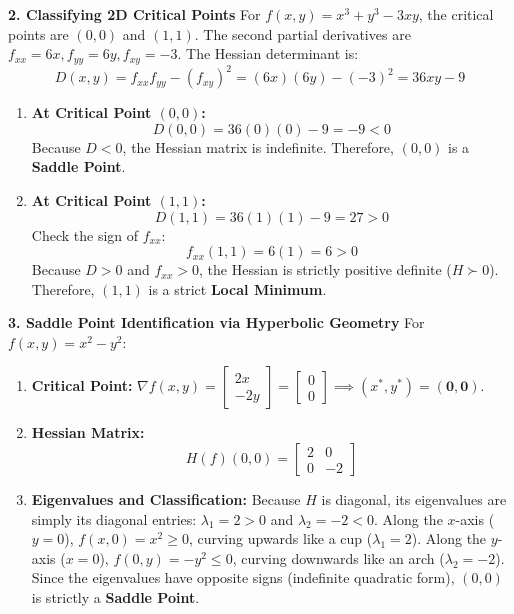 \textbf{2. Classifying 2D Critical Points}
For $f(x, y) = x^3 + y^3 - 3xy$, the critical points are $(0, 0)$ and $(1, 1)$.
The second partial derivatives are $f_{xx} = 6x, f_{yy} = 6y, f_{xy} = -3$.
The Hessian determinant is:
\begin{equation*}
D(x, y) = f_{xx} f_{yy} - (f_{xy})^2 = (6x)(6y) - (-3)^2 = 36xy - 9
\end{equation*}
\begin{enumerate}
    \item \textbf{At Critical Point $(0, 0)$:}
    \begin{equation*}
    D(0, 0) = 36(0)(0) - 9 = -9 < 0
    \end{equation*}
    Because $D < 0$, the Hessian matrix is indefinite. Therefore, $(0, 0)$ is a \textbf{Saddle Point}.
    \item \textbf{At Critical Point $(1, 1)$:}
    \begin{equation*}
    D(1, 1) = 36(1)(1) - 9 = 27 > 0
    \end{equation*}
    Check the sign of $f_{xx}$:
    \begin{equation*}
    f_{xx}(1, 1) = 6(1) = 6 > 0
    \end{equation*}
    Because $D > 0$ and $f_{xx} > 0$, the Hessian is strictly positive definite ($H \succ 0$).
    Therefore, $(1, 1)$ is a strict \textbf{Local Minimum}.
\end{enumerate}

\textbf{3. Saddle Point Identification via Hyperbolic Geometry}
For $f(x, y) = x^2 - y^2$:
\begin{enumerate}
    \item \textbf{Critical Point:}
    $\nabla f(x, y) = \begin{bmatrix} 2x \\ -2y \end{bmatrix} = \begin{bmatrix} 0 \\ 0 \end{bmatrix} \implies (x^*, y^*) = \mathbf{(0, 0)}$.
    \item \textbf{Hessian Matrix:}
    \begin{equation*}
    H(f)(0, 0) = \begin{bmatrix} 2 & 0 \\ 0 & -2 \end{bmatrix}
    \end{equation*}
    \item \textbf{Eigenvalues and Classification:}
    Because $H$ is diagonal, its eigenvalues are simply its diagonal entries: $\lambda_1 = 2 > 0$ and $\lambda_2 = -2 < 0$.
    Along the $x$-axis ($y=0$), $f(x, 0) = x^2 \ge 0$, curving upwards like a cup ($\lambda_1 = 2$).
    Along the $y$-axis ($x=0$), $f(0, y) = -y^2 \le 0$, curving downwards like an arch ($\lambda_2 = -2$).
    Since the eigenvalues have opposite signs (indefinite quadratic form), $(0, 0)$ is strictly a \textbf{Saddle Point}.
\end{enumerate}

